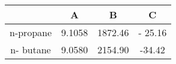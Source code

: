 \begin{table}[h!]
\centering
\begin{tabular}{|c|c|c|c|}
    \hline
     & A & B & C \\
    \hline
    n-propane & 9.1058 & 1872.46  & - 25.16  \\
    \hline
    n- butane & 9.0580 & 2154.90 & -34.42 \\
    \hline
\end{tabular}    
\end{table}